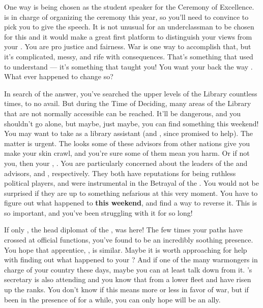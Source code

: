 \documentclass[char]{GL2020}
\begin{document}
One way is being chosen as the student speaker for the Ceremony of Excellence. \cMusic{\full} is in charge of organizing the ceremony this year, so you'll need to convince \cMusic{\them} to pick you to give the speech. It is not unusual for an underclassman to be chosen for this and it would make a great first platform to distinguish your views from your \cLoud{\parent}. You are pro justice and fairness. War is one way to accomplish that, but it's complicated, messy, and rife with consequences. That's something that \cLoud{} used to understand — it's something that \cLoud{\they} taught you! You want your \cLoud{\parent} back the way \cLoud{\they} \cLoud{\were}. What ever happened to change \cLoud{\them} so?

In search of the answer, you've searched the upper levels of the Library countless times, to no avail. But during the Time of Deciding, many areas of the Library that are not normally accessible can be reached. It'll be dangerous, and you shouldn't go alone, but maybe, just maybe, you can find something this weekend! You may want to take \cPresident{} as \cPresident{\they} \cPresident{\are} a library assistant (and \cHeir{}, since \cHeir{\they} promised to help). The matter is urgent. The looks some of these advisors from other nations give you make your skin crawl, and you're sure some of them mean you harm. Or if not you, then your \cLoud{\parent}, \cLoud{}. You are particularly concerned about the leaders of the \pTech{} and \pFarm{} advisors, \cDiplomat{\full} and \cEvil{\full}, respectively. They both have reputations for being ruthless political players, and were instrumental in the Betrayal of the \pShip{}. You would not be surprised if they are up to something nefarious at this very moment. You have to figure out what happened to \cLoud{} \textbf{this weekend}, and find a way to reverse it. This is so important, and you've been struggling with it for so long!

If only \cHeadDiplomat{\full}, the head diplomat of the \pShip{}, was here! The few times your paths have crossed at official functions, you've found \cHeadDiplomat{\them} to be an incredibly soothing presence. You hope that \cHeadDiplomat{\their} apprentice, \cJuniorStatesman{\full}, is similar. Maybe it is worth approaching \cJuniorStatesman{\them} for help with finding out what happened to your \cLoud{\parent}? And if \cJuniorStatesman{\theyare} one of the many warmongers in charge of your country these days, maybe you can at least talk \cJuniorStatesman{\them} down from it. \cHeadDiplomat{}’s secretary \cChupLeader{\full} is also attending and you know that \cChupLeader{\theyare} from a lower fleet and have risen up the ranks. You don’t know if this means \cChupLeader{\theyare} more or less in favor of war, but if \cChupLeader{\they{} \have} been in the presence of \cHeadDiplomat{} for a while, you can only hope \cChupLeader{\they} will be an ally.  
\end{document}
